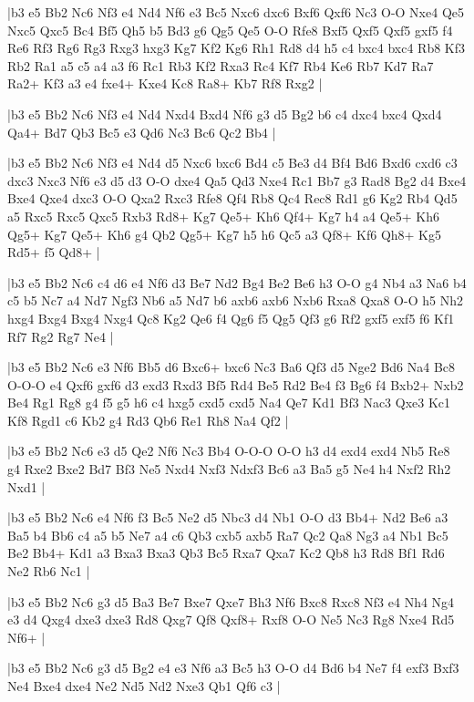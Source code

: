 \whitename{}
\blackname{}
\makegametitle
|b3 e5 Bb2 Nc6 Nf3 e4 Nd4 Nf6 e3 Bc5 Nxc6 dxc6 Bxf6 Qxf6 Nc3 O-O Nxe4 Qe5 Nxc5 Qxc5 Bc4 Bf5 Qh5 b5 Bd3 g6 Qg5 Qe5 O-O Rfe8 Bxf5 Qxf5 Qxf5 gxf5 f4 Re6 Rf3 Rg6 Rg3 Rxg3 hxg3 Kg7 Kf2 Kg6 Rh1 Rd8 d4 h5 c4 bxc4 bxc4 Rb8 Kf3 Rb2 Ra1 a5 c5 a4 a3 f6 Rc1 Rb3 Kf2 Rxa3 Rc4 Kf7 Rb4 Ke6 Rb7 Kd7 Ra7 Ra2+ Kf3 a3 e4 fxe4+ Kxe4 Kc8 Ra8+ Kb7 Rf8 Rxg2  |

\whitename{}
\blackname{}
\makegametitle
|b3 e5 Bb2 Nc6 Nf3 e4 Nd4 Nxd4 Bxd4 Nf6 g3 d5 Bg2 b6 c4 dxc4 bxc4 Qxd4 Qa4+ Bd7 Qb3 Bc5 e3 Qd6 Nc3 Bc6 Qc2 Bb4  |

\whitename{}
\blackname{}
\makegametitle
|b3 e5 Bb2 Nc6 Nf3 e4 Nd4 d5 Nxc6 bxc6 Bd4 c5 Be3 d4 Bf4 Bd6 Bxd6 cxd6 c3 dxc3 Nxc3 Nf6 e3 d5 d3 O-O dxe4 Qa5 Qd3 Nxe4 Rc1 Bb7 g3 Rad8 Bg2 d4 Bxe4 Bxe4 Qxe4 dxc3 O-O Qxa2 Rxc3 Rfe8 Qf4 Rb8 Qc4 Rec8 Rd1 g6 Kg2 Rb4 Qd5 a5 Rxc5 Rxc5 Qxc5 Rxb3 Rd8+ Kg7 Qe5+ Kh6 Qf4+ Kg7 h4 a4 Qe5+ Kh6 Qg5+ Kg7 Qe5+ Kh6 g4 Qb2 Qg5+ Kg7 h5 h6 Qc5 a3 Qf8+ Kf6 Qh8+ Kg5 Rd5+ f5 Qd8+  |

\whitename{}
\blackname{}
\makegametitle
|b3 e5 Bb2 Nc6 c4 d6 e4 Nf6 d3 Be7 Nd2 Bg4 Be2 Be6 h3 O-O g4 Nb4 a3 Na6 b4 c5 b5 Nc7 a4 Nd7 Ngf3 Nb6 a5 Nd7 b6 axb6 axb6 Nxb6 Rxa8 Qxa8 O-O h5 Nh2 hxg4 Bxg4 Bxg4 Nxg4 Qc8 Kg2 Qe6 f4 Qg6 f5 Qg5 Qf3 g6 Rf2 gxf5 exf5 f6 Kf1 Rf7 Rg2 Rg7 Ne4  |

\whitename{}
\blackname{}
\makegametitle
|b3 e5 Bb2 Nc6 e3 Nf6 Bb5 d6 Bxc6+ bxc6 Nc3 Ba6 Qf3 d5 Nge2 Bd6 Na4 Bc8 O-O-O e4 Qxf6 gxf6 d3 exd3 Rxd3 Bf5 Rd4 Be5 Rd2 Be4 f3 Bg6 f4 Bxb2+ Nxb2 Be4 Rg1 Rg8 g4 f5 g5 h6 c4 hxg5 cxd5 cxd5 Na4 Qe7 Kd1 Bf3 Nac3 Qxe3 Kc1 Kf8 Rgd1 c6 Kb2 g4 Rd3 Qb6 Re1 Rh8 Na4 Qf2  |

\whitename{}
\blackname{}
\makegametitle
|b3 e5 Bb2 Nc6 e3 d5 Qe2 Nf6 Nc3 Bb4 O-O-O O-O h3 d4 exd4 exd4 Nb5 Re8 g4 Rxe2 Bxe2 Bd7 Bf3 Ne5 Nxd4 Nxf3 Ndxf3 Bc6 a3 Ba5 g5 Ne4 h4 Nxf2 Rh2 Nxd1  |

\whitename{}
\blackname{}
\makegametitle
|b3 e5 Bb2 Nc6 e4 Nf6 f3 Bc5 Ne2 d5 Nbc3 d4 Nb1 O-O d3 Bb4+ Nd2 Be6 a3 Ba5 b4 Bb6 c4 a5 b5 Ne7 a4 c6 Qb3 cxb5 axb5 Ra7 Qc2 Qa8 Ng3 a4 Nb1 Bc5 Be2 Bb4+ Kd1 a3 Bxa3 Bxa3 Qb3 Bc5 Rxa7 Qxa7 Kc2 Qb8 h3 Rd8 Bf1 Rd6 Ne2 Rb6 Nc1  |

\whitename{}
\blackname{}
\makegametitle
|b3 e5 Bb2 Nc6 g3 d5 Ba3 Be7 Bxe7 Qxe7 Bh3 Nf6 Bxc8 Rxc8 Nf3 e4 Nh4 Ng4 e3 d4 Qxg4 dxe3 dxe3 Rd8 Qxg7 Qf8 Qxf8+ Rxf8 O-O Ne5 Nc3 Rg8 Nxe4 Rd5 Nf6+  |

\whitename{}
\blackname{}
\makegametitle
|b3 e5 Bb2 Nc6 g3 d5 Bg2 e4 e3 Nf6 a3 Bc5 h3 O-O d4 Bd6 b4 Ne7 f4 exf3 Bxf3 Ne4 Bxe4 dxe4 Ne2 Nd5 Nd2 Nxe3 Qb1 Qf6 c3  |

